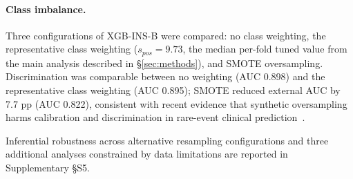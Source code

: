 \paragraph{Class imbalance.} Three configurations of XGB-INS-B were compared: no class weighting, the representative class weighting ($s_{pos} = 9.73$, the median per-fold tuned value from the main analysis described in \S\ref{sec:methods}), and SMOTE oversampling. Discrimination was comparable between no weighting (AUC 0.898) and the representative class weighting (AUC 0.895); SMOTE reduced external AUC by 7.7 pp (AUC 0.822), consistent with recent evidence that synthetic oversampling harms calibration and discrimination in rare-event clinical prediction~\cite{Carriero2025}.

Inferential robustness across alternative resampling configurations and three additional analyses constrained by data limitations are reported in Supplementary §S5.

